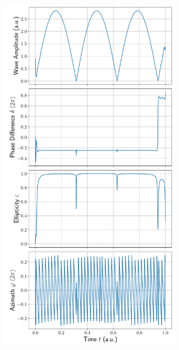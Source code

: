 \documentclass[a4paper,DIV=12,english]{scrartcl}
\begin{document}
\subsection{}
\begin{figure}
    \centering
    \begin{subfigure}{0.49\textwidth}
        \centering
        \includegraphics[width=\textwidth]{../wave1.pdf}

\end{subfigure}
\end{figure}
\end{document}
